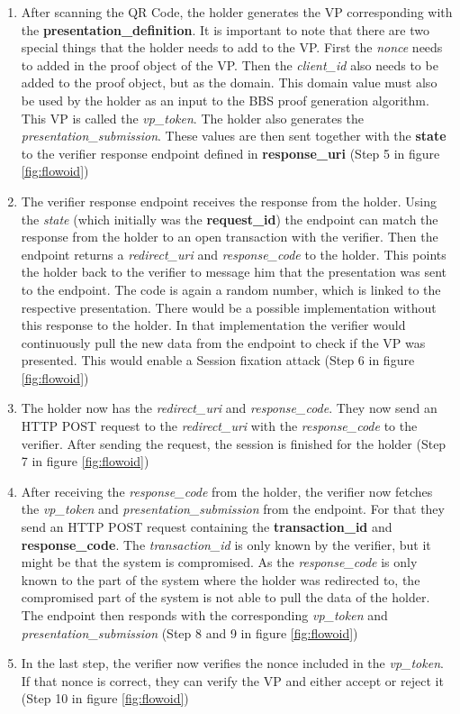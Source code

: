 \documentclass[
	a4paper               %
	,BCOR=0mm            %
	,bibliography=totoc   %
	,listof=totoc         %
	,monolingual
	,twoside=false
]{bfhthesis}              %
\begin{document}
\begin{enumerate}
\begin{itemize}
	\end{itemize}
	\item After scanning the QR Code, the holder generates the VP corresponding with the \textbf{presentation\_definition}. It is important to note that there are two special things that the holder needs to add to the VP. First the \textit{nonce} needs to added in the proof object of the VP. Then the \textit{client\_id} also needs to be added to the proof object, but as the domain. This domain value must also be used by the holder as an input to the BBS proof generation algorithm. This VP is called the \textit{vp\_token}. The holder also generates the \textit{presentation\_submission}. These values are then sent together with the \textbf{state} to the verifier response endpoint defined in \textbf{response\_uri} (Step 5 in figure \ref{fig:flowoid})
	\item The verifier response endpoint receives the response from the holder. Using the \textit{state} (which initially was the \textbf{request\_id}) the endpoint can match the response from the holder to an open transaction with the verifier. Then the endpoint returns a \textit{redirect\_uri} and \textit{response\_code} to the holder. This points the holder back to the verifier to message him that the presentation was sent to the endpoint. The code is again a random number, which is linked to the respective presentation. There would be a possible implementation without this response to the holder. In that implementation the verifier would continuously pull the new data from the endpoint to check if the VP was presented. This would enable a Session fixation attack (Step 6 in figure \ref{fig:flowoid})
	\item The holder now has the \textit{redirect\_uri} and \textit{response\_code}. They now send an HTTP POST request to the \textit{redirect\_uri} with the \textit{response\_code} to the verifier. After sending the request, the session is finished for the holder (Step 7 in figure \ref{fig:flowoid})
	\item After receiving the \textit{response\_code} from the holder, the verifier now fetches the \textit{vp\_token} and \textit{presentation\_submission} from the endpoint. For that they send an HTTP POST request containing the \textbf{transaction\_id} and \textbf{response\_code}. The \textit{transaction\_id} is only known by the verifier, but it might be that the system is compromised. As the \textit{response\_code} is only known to the part of the system where the holder was redirected to, the compromised part of the system is not able to pull the data of the holder. The endpoint then responds with the corresponding \textit{vp\_token} and \textit{presentation\_submission} (Step 8 and 9 in figure \ref{fig:flowoid})
	\item In the last step, the verifier now verifies the nonce included in the \textit{vp\_token}. If that nonce is correct, they can verify the VP and either accept or reject it (Step 10 in figure \ref{fig:flowoid})
\end{enumerate}
\end{document}
